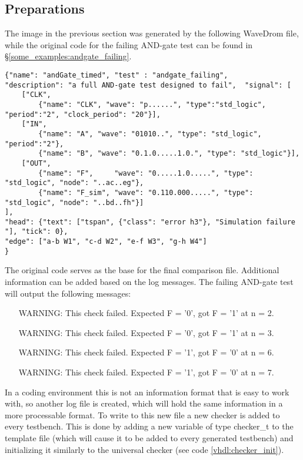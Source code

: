 \subsection{Preparations}
The image in the previous section was generated by the following WaveDrom file, while the original code for the failing AND-gate test can be found in §\ref{some_examples:andgate_failing}.
\begin{lstlisting}[style=json, caption={Source file for the proposed layout in fig \ref{fig:andgate_failing_result}}, label={json:andgate_failing_example}]
{"name": "andGate_timed", "test" : "andgate_failing", 
"description": "a full AND-gate test designed to fail",  "signal": [
	["CLK",
		{"name": "CLK", "wave": "p......", "type":"std_logic", "period":"2", "clock_period": "20"}],
	["IN",
		{"name": "A", "wave": "01010..", "type": "std_logic", "period":"2"},
		{"name": "B", "wave": "0.1.0.....1.0.", "type": "std_logic"}],
	["OUT",
		{"name": "F",     "wave": "0.....1.0.....", "type": "std_logic", "node": "..ac..eg"},
		{"name": "F_sim", "wave": "0.110.000.....", "type": "std_logic", "node": "..bd..fh"}]
], 
"head": {"text": ["tspan", {"class": "error h3"}, "Simulation failure "], "tick": 0}, 
"edge": ["a-b W1", "c-d W2", "e-f W3", "g-h W4"]
}
\end{lstlisting}\noindent
The original code serves as the base for the final comparison file. Additional information can be added based on the log messages.
\npar
The failing AND-gate test will output the following messages:
\begin{customenv}\label{somelabel}
	\begin{itemize}
		\centering
		\item [WARNING:] This check failed. Expected F = '0', got F = '1' at n = 2.
		\item [WARNING:] This check failed. Expected F = '0', got F = '1' at n = 3.
		\item [WARNING:] This check failed. Expected F = '1', got F = '0' at n = 6.
		\item [WARNING:] This check failed. Expected F = '1', got F = '0' at n = 7.
	\end{itemize}
\end{customenv}\newpage\noindent
In a coding environment this is not an information format that is easy to work with, so another log file is created, which will hold the same information in a more processable format. To write to this new file a new checker is added to every testbench. This is done by adding a new variable of type checker\_t to the template file (which will cause it to be added to every generated testbench) and initializing it similarly to the universal checker (see code \ref{vhdl:checker_init}).

